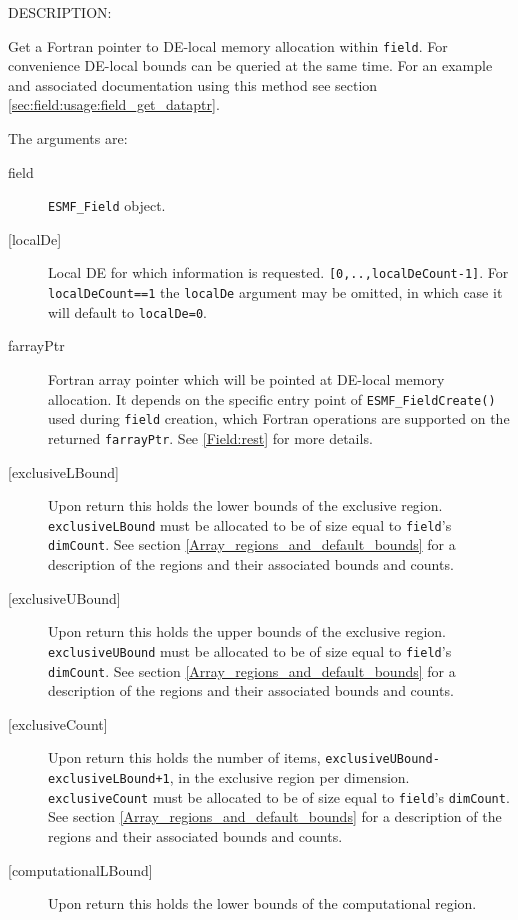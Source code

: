 {\sf DESCRIPTION:\\ }

 
   Get a Fortran pointer to DE-local memory allocation within {\tt field}. 
   For convenience DE-local bounds can be queried at the same time. 
   For an example and 
   associated documentation using this method see section 
   \ref{sec:field:usage:field_get_dataptr}. 
   
   The arguments are: 
   \begin{description} 
   \item [field] 
   {\tt ESMF\_Field} object. 
   \item[{[localDe]}] 
   Local DE for which information is requested. {\tt [0,..,localDeCount-1]}. 
   For {\tt localDeCount==1} the {\tt localDe} argument may be omitted, 
   in which case it will default to {\tt localDe=0}. 
   \item [farrayPtr] 
   Fortran array pointer which will be pointed at DE-local memory allocation. 
   It depends on the specific entry point 
   of {\tt ESMF\_FieldCreate()} used during {\tt field} creation, which 
   Fortran operations are supported on the returned {\tt farrayPtr}. See 
   \ref{Field:rest} for more details. 
   \item[{[exclusiveLBound]}] 
   Upon return this holds the lower bounds of the exclusive region. 
   {\tt exclusiveLBound} must be allocated to be of size equal to {\tt field}'s {\tt dimCount}. 
   See section \ref{Array_regions_and_default_bounds} for a description 
   of the regions and their associated bounds and counts. 
   \item[{[exclusiveUBound]}] 
   Upon return this holds the upper bounds of the exclusive region. 
   {\tt exclusiveUBound} must be allocated to be of size equal to {\tt field}'s {\tt dimCount}. 
   See section \ref{Array_regions_and_default_bounds} for a description 
   of the regions and their associated bounds and counts. 
   \item[{[exclusiveCount]}] 
   Upon return this holds the number of items, {\tt exclusiveUBound-exclusiveLBound+1}, 
   in the exclusive region per dimension. 
   {\tt exclusiveCount} must 
   be allocated to be of size equal to {\tt field}'s {\tt dimCount}. 
   See section \ref{Array_regions_and_default_bounds} for a description 
   of the regions and their associated bounds and counts. 
   \item[{[computationalLBound]}] 
   \begin{sloppypar} 
   Upon return this holds the lower bounds of the computational region. 

\end{sloppypar}
\end{description}
